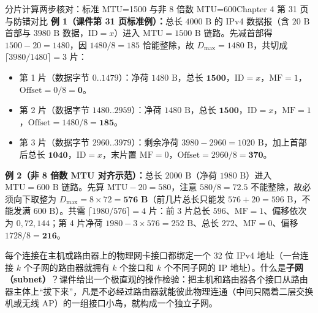 \begin{StudyBlock}{分片计算两步核对：标准 MTU=1500 与非 8 倍数 MTU=600}{Chapter 4 第 31 页与防错对比}
\textbf{例 1（课件第 31 页标准例）：}总长 $4000\text{ B}$ 的 IPv4 数据报（含 $20\text{ B}$ 首部与 $3980\text{ B}$ 数据，$\mathrm{ID}=x$）进入 $\mathrm{MTU}=1500\text{ B}$ 链路。先减首部得 $1500 - 20 = 1480$，因 $1480 / 8 = 185$ 恰能整除，故 $D_{\max} = 1480\text{ B}$，共切成 $\lceil 3980 / 1480\rceil = 3$ 片：
\begin{itemize}
\item 第 1 片（数据字节 $0..1479$）：净荷 $1480\text{ B}$，总长 $\mathbf{1500}$，$\mathrm{ID}=x$，$\mathrm{MF}=1$，$\mathrm{Offset} = 0 / 8 = \mathbf{0}$。
\item 第 2 片（数据字节 $1480..2959$）：净荷 $1480\text{ B}$，总长 $\mathbf{1500}$，$\mathrm{ID}=x$，$\mathrm{MF}=1$，$\mathrm{Offset} = 1480 / 8 = \mathbf{185}$。
\item 第 3 片（数据字节 $2960..3979$）：剩余净荷 $3980 - 2960 = 1020\text{ B}$，加上首部后总长 $\mathbf{1040}$，$\mathrm{ID}=x$，末片置 $\mathrm{MF}=0$，$\mathrm{Offset} = 2960 / 8 = \mathbf{370}$。
\end{itemize}
\textbf{例 2（非 8 倍数 MTU 对齐示范）：}总长 $2000\text{ B}$（净荷 $1980\text{ B}$）进入 $\mathrm{MTU}=600\text{ B}$ 链路。先算 $\mathrm{MTU} - 20 = 580$，注意 $580 / 8 = 72.5$ 不能整除，故必须向下取整为 $D_{\max} = 8\times 72 = \mathbf{576\text{ B}}$（前几片总长只能发 $576 + 20 = 596\text{ B}$，不能发满 $600\text{ B}$）。共需 $\lceil 1980/576\rceil = 4$ 片：前 3 片总长 $596$、$\mathrm{MF}=1$、偏移依次为 $0, 72, 144$；第 4 片净荷 $1980 - 3\times 576 = 252\text{ B}$、总长 $272$、$\mathrm{MF}=0$、偏移 $1728 / 8 = \mathbf{216}$。
\end{StudyBlock}




每个连接在主机或路由器上的物理网卡接口都绑定一个 32 位 IPv4 地址（一台连接 $k$ 个子网的路由器就拥有 $k$ 个接口和 $k$ 个不同子网的 IP 地址）。什么是\textbf{子网（subnet）}？课件给出一个极直观的操作检验：把主机和路由器各个接口从路由器主体上“拔下来”，凡是不必经过路由器就能彼此物理连通（中间只隔着二层交换机或无线 AP）的一组接口小岛，就构成一个独立子网。

